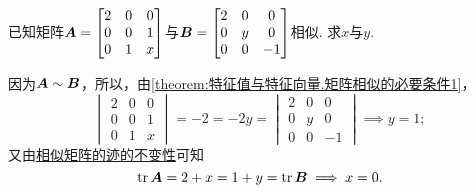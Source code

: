 \begin{example}
已知矩阵\(\boldsymbol{A} = \begin{bmatrix}
	2 & 0 & 0 \\
	0 & 0 & 1 \\
	0 & 1 & x
\end{bmatrix}\)与\(\boldsymbol{B} = \begin{bmatrix}
	2 & 0 & 0 \\
	0 & y & 0 \\
	0 & 0 & -1
\end{bmatrix}\)相似.
求\(x\)与\(y\).
\begin{solution}
因为\(\boldsymbol{A}\sim\boldsymbol{B}\)，所以，由\cref{theorem:特征值与特征向量.矩阵相似的必要条件1}，
\[
	\begin{vmatrix}
		2 & 0 & 0 \\
		0 & 0 & 1 \\
		0 & 1 & x
	\end{vmatrix}
	= -2 = -2y =
	\begin{vmatrix}
		2 & 0 & 0 \\
		0 & y & 0 \\
		0 & 0 & -1
	\end{vmatrix}
	\implies y = 1;
\]
又由\hyperref[theorem:特征值与特征向量.相似矩阵的迹的不变性]{相似矩阵的迹的不变性}可知\[
	\tr\boldsymbol{A} = 2+x
	= 1+y = \tr\boldsymbol{B}
	\implies
	x = 0.
\]
\end{solution}
\end{example}
